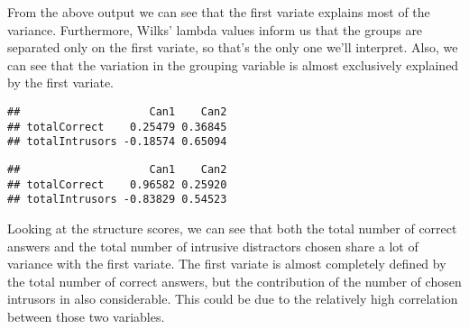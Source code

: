 \documentclass[12pt,]{article}
\newenvironment{Shaded}{\begin{snugshade}}{\end{snugshade}}
\newcommand{\KeywordTok}[1]{\textcolor[rgb]{0.13,0.29,0.53}{\textbf{#1}}}
\newcommand{\NormalTok}[1]{#1}
\newcommand{\OperatorTok}[1]{\textcolor[rgb]{0.81,0.36,0.00}{\textbf{#1}}}
\newcommand{\StringTok}[1]{\textcolor[rgb]{0.31,0.60,0.02}{#1}}
\begin{document}
From the above output we can see that the first variate explains most of
the variance. Furthermore, Wilks' lambda values inform us that the
groups are separated only on the first variate, so that's the only one
we'll interpret. Also, we can see that the variation in the grouping
variable is almost exclusively explained by the first variate.

\begin{Shaded}
\end{Shaded}

\begin{verbatim}
##                    Can1    Can2
## totalCorrect    0.25479 0.36845
## totalIntrusors -0.18574 0.65094
\end{verbatim}

\begin{Shaded}
\end{Shaded}

\begin{verbatim}
##                    Can1    Can2
## totalCorrect    0.96582 0.25920
## totalIntrusors -0.83829 0.54523
\end{verbatim}

Looking at the structure scores, we can see that both the total number
of correct answers and the total number of intrusive distractors chosen
share a lot of variance with the first variate. The first variate is
almost completely defined by the total number of correct answers, but
the contribution of the number of chosen intrusors in also considerable.
This could be due to the relatively high correlation between those two
variables.
\end{document}

